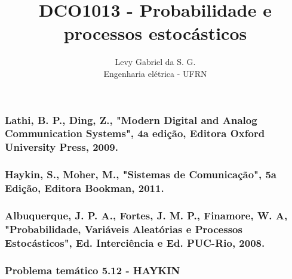 \title{DCO1013 - Probabilidade e processos estocásticos}
\author{Levy Gabriel da S. G. \\ Engenharia elétrica - UFRN}

\maketitle
\thispagestyle{fancy}

\subsubsection*{Lathi, B. P., Ding, Z., "Modern Digital and Analog Communication Systems", 4a edição, Editora Oxford University Press, 2009.}

\subsubsection*{Haykin, S., Moher, M., "Sistemas de Comunicação", 5a Edição, Editora Bookman, 2011.}

\subsubsection*{Albuquerque, J. P. A., Fortes, J. M. P., Finamore, W. A, "Probabilidade, Variáveis Aleatórias e Processos Estocásticos", Ed. Interciência e Ed. PUC-Rio, 2008.}

\subsubsection*{Problema temático 5.12 - HAYKIN}
